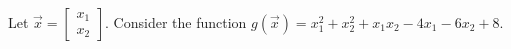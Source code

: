 \documentclass[twoside,12pt]{article}
\newcommand{\nishant}[1]{{\color{orange}[{\bf Nishant}: #1]}}
\newcommand{\suraj}[1]{{\color{blue}[{\bf Suraj}: #1]}}
\begin{document}
\begin{probset}
\begin{prob}


















\end{prob}

\newpage \begin{prob}[(10 pts)]

Let $\vec{x} = \begin{bmatrix} x_1 \\ x_2 \end{bmatrix}$. Consider the function $g(\vec{x}) = x_1^2 + x_2^2 + x_1 x_2 - 4x_1 - 6x_2 + 8$.
\begin{subprobset}


\end{subprobset}
\end{prob}
\end{probset}
\end{document}
